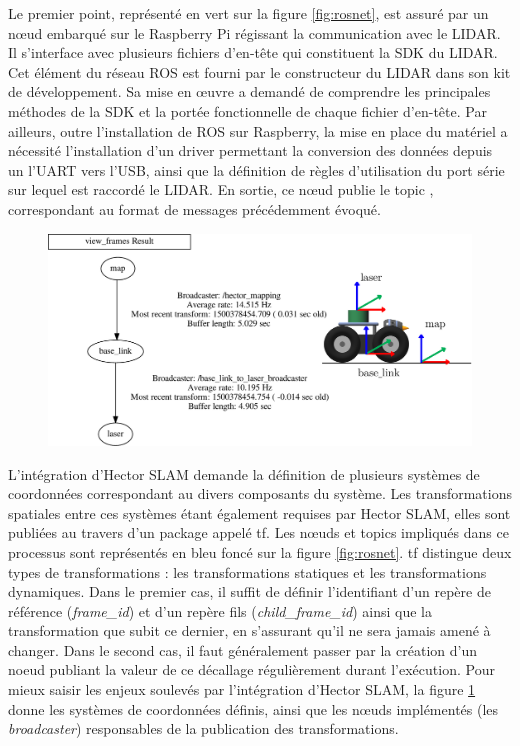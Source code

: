 Le premier point, représenté en vert sur la figure \ref{fig:rosnet}, est assuré par un n\oe{}ud embarqué sur le Raspberry Pi régissant la communication avec le \gls{LIDAR}.   
Il s'interface avec plusieurs fichiers d'en-tête qui constituent la \gls{SDK} du \gls{LIDAR}.
Cet élément du réseau \gls{ROS} est fourni par le constructeur du \gls{LIDAR} dans son kit de développement.
Sa mise en \oe{}uvre a demandé de comprendre les principales méthodes de la \gls{SDK} et la portée fonctionnelle de chaque fichier d'en-tête. 
Par ailleurs, outre l'installation de \gls{ROS} sur Raspberry, la mise en place du matériel a nécessité l'installation d'un driver permettant la conversion des données 
depuis un l'UART vers l'USB, ainsi que la définition de règles d'utilisation du port série sur lequel est raccordé le \gls{LIDAR}.
En sortie, ce n\oe{}ud publie le topic , correspondant au format de messages  précédemment évoqué. 

\begin{figure}[h]
  \centering
    \includegraphics[width=1.\linewidth]{figures/frames_and_schema}  
  \label{fig:frames}
\end{figure}

L'intégration d'Hector SLAM demande la définition de plusieurs systèmes de coordonnées correspondant au divers composants du système.
Les transformations spatiales entre ces systèmes étant également requises par \gls{Hector SLAM}, elles sont publiées au travers d'un package appelé \gls{tf}\cite{Bib_ROS_tf}\cite{Bib_tf}. 
Les n\oe{}uds et topics impliqués dans ce processus sont représentés en bleu foncé sur la figure \ref{fig:rosnet}. 
\gls{tf} distingue deux types de transformations : les transformations statiques et les transformations dynamiques. 
Dans le premier cas, il suffit de définir l'identifiant d'un repère de référence (\emph{frame\_id}) et d'un repère fils (\emph{child\_frame\_id}) ainsi que la transformation que subit ce dernier, en s'assurant qu'il ne sera jamais amené à changer.
Dans le second cas, il faut généralement passer par la création d'un noeud publiant la valeur de ce décallage régulièrement durant l'exécution. 
Pour mieux saisir les enjeux soulevés par l'intégration d'\gls{Hector SLAM}, la figure \ref{fig:frames} donne les systèmes de coordonnées définis, 
ainsi que les n\oe{}uds implémentés (les \emph{broadcaster}) responsables de la publication des transformations. 

